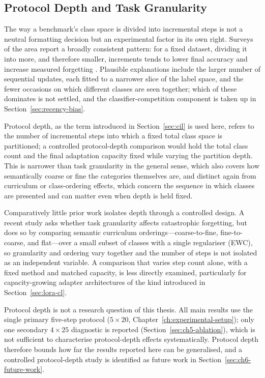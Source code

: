 \subsection{Protocol Depth and Task Granularity}
\label{sec:protocol-depth}

The way a benchmark's class space is divided into incremental steps is not
a neutral formatting decision but an experimental factor in its own right.
Surveys of the area report a broadly consistent pattern: for a fixed
dataset, dividing it into more, and therefore smaller, increments tends to
lower final accuracy and increase measured forgetting \parencite{masana2020classincremental,delange2022continual}.
Plausible explanations include the larger number of sequential updates,
each fitted to a narrower slice of the label space, and the fewer occasions
on which different classes are seen together; which of these dominates is
not settled, and the classifier-competition component is taken up in
Section~\ref{sec:recency-bias}.

Protocol depth, as the term introduced in Section~\ref{sec:cil} is used
here, refers to the number of incremental steps into which a fixed total
class space is partitioned; a controlled protocol-depth comparison would
hold the total class count and the final adaptation capacity fixed while
varying the partition depth. This is narrower than task granularity in the
general sense, which also covers how semantically coarse or fine the
categories themselves are, and distinct again from curriculum or
class-ordering effects, which concern the sequence in which classes are
presented and can matter even when depth is held fixed.

Comparatively little prior work isolates depth through a controlled
design. A recent study \cite{alyamac2026evaluating} asks whether task
granularity affects catastrophic forgetting, but does so by comparing
semantic curriculum orderings---coarse-to-fine, fine-to-coarse, and
flat---over a small subset of classes with a single regulariser (EWC), so
granularity and ordering vary together and the number of steps is not
isolated as an independent variable. A comparison that varies step count
alone, with a fixed method and matched capacity, is less directly
examined, particularly for capacity-growing adapter architectures of the
kind introduced in Section~\ref{sec:lora-cl}.

Protocol depth is not a research question of this thesis. All main
results use the single primary five-step protocol ($5\times20$,
Chapter~\ref{ch:experimental-setup}); only one secondary $4\times25$
diagnostic is reported (Section~\ref{sec:ch5-ablation}), which is not
sufficient to characterise protocol-depth effects systematically. Protocol
depth therefore bounds how far the results reported here can be
generalised, and a controlled protocol-depth study is identified as future
work in Section~\ref{sec:ch6-future-work}.


